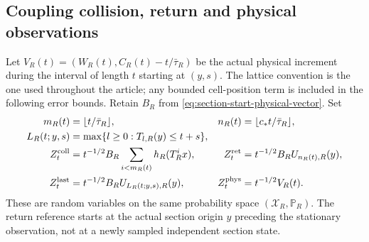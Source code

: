 \subsection{Coupling collision, return and physical observations}
Let $V_R(t)=(W_R(t),C_R(t)-t/\bar\tau_R)$ be the actual physical
increment during the interval of length $t$ starting at $(y,s)$.
The lattice convention is the one used throughout the article; any
bounded cell-position term is included in the following error bounds.
Retain $B_R$ from \eqref{eq:section-start-physical-vector}. Set
\begin{align}
 m_R(t)&=\lfloor t/\bar\tau_R\rfloor,&
 n_R(t)&=\lfloor c_*t/\bar\tau_R\rfloor,\notag\\
 L_R(t;y,s)&=\max\{l\ge0:T_{l,R}(y)\le t+s\},\notag\\
 Z_t^{\rm coll}&=t^{-1/2}B_R\sum_{i<m_R(t)}h_R(T_R^ix),&
 Z_t^{\rm ret}&=t^{-1/2}B_RU_{n_R(t),R}(y),\notag\\
 Z_t^{\rm last}&=t^{-1/2}B_RU_{L_R(t;y,s),R}(y),&
 Z_t^{\rm phys}&=t^{-1/2}V_R(t).
 \label{eq:stationary-four-observations}
\end{align}
These are random variables on the same probability space
$(\mathcal X_R,\mathbb P_R)$. The return reference starts at the
actual section origin $y$ preceding the stationary observation, not
at a newly sampled independent section state.

